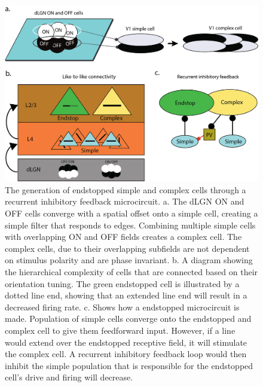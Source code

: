 \documentclass[12pt]{article}
\begin{document}
\begin{figure}[H]
  \centering
  \includegraphics[width=1.0 \textwidth]{adjusted_figures/LIF_Overview_Receptive_Field_Methods.png}
  \caption{The generation of endstopped simple and complex cells through a recurrent inhibitory feedback microcircuit. a. The dLGN ON and OFF cells converge with a spatial offset onto a simple cell, creating a simple filter that responds to edges. Combining multiple simple cells with overlapping ON and OFF fields creates a complex cell. The complex cells, due to their overlapping subfields are not dependent on stimulus polarity and are phase invariant. b. A diagram showing the hierarchical complexity of cells that are connected based on their orientation tuning. The green endstopped cell is illustrated by a dotted line end, showing that an extended line end will result in a decreased firing rate. c. Shows how a endstopped microcircuit is made. Population of simple cells converge onto the endstopped and complex cell to give them feedforward input. However, if a line would extend over the endstopped receptive field, it will stimulate the complex cell. A recurrent inhibitory feedback loop would then inhibit the simple population that is responsible for the endstopped cell's drive and firing will decrease.}
  \label{fig:LIF_Overview}
\end{figure}
\end{document}
